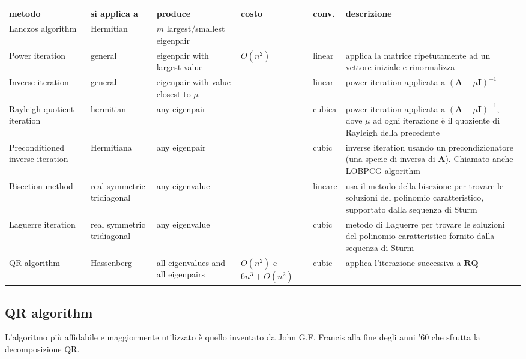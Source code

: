 \documentclass[10pt]{article}
\begin{document}
\noindent
\begin{tabular}{p{28mm} p{2cm} p{3cm} p{1cm} l l}
\textbf{metodo} & \textbf{si applica a} & \textbf{produce} & \textbf{costo} & \textbf{conv.} & \textbf{descrizione} \\
\hline
Lanczos algorithm & Hermitian & $m$ largest/smallest eigenpair & & & \\
\hline
Power iteration & general & eigenpair with largest value & $O(n^2)$ & linear & applica la matrice ripetutamente ad un vettore iniziale e rinormalizza \\
\hline
Inverse iteration & general & eigenpair with value closest to $\mu$ &  & linear & power iteration applicata a $(\mathbf{A} - \mu \mathbf{I})^{-1}$ \\
\hline
Rayleigh quotient iteration & hermitian & any eigenpair & & cubica & power iteration applicata a $(\mathbf{A} - \mu \mathbf{I})^{-1}$, dove $\mu$ ad ogni iterazione è il quoziente di Rayleigh della precedente \\
\hline
Preconditioned inverse iteration & Hermitiana & any eigenpair & & cubic & inverse iteration usando un precondizionatore (una specie di inversa di $\mathbf{A}$). Chiamato anche LOBPCG algorithm \\
\hline
Bisection method & real symmetric tridiagonal & any eigenvalue & & lineare & usa il metodo della bisezione per trovare le soluzioni del polinomio caratteristico, supportato dalla sequenza di Sturm \\
\hline
Laguerre iteration & real symmetric tridiagonal & any eigenvalue & & cubic & metodo di Laguerre per trovare le soluzioni del polinomio caratteristico fornito dalla sequenza di Sturm \\
\hline
QR algorithm & Hassenberg & all eigenvalues and all eigenpairs & $O(n^2)$ e $6n^3+O(n^2)$ & cubic & applica l'iterazione successiva a $\mathbf{R}\mathbf{Q}$ \\

\end{tabular}

\subsection{QR algorithm}

L'algoritmo più affidabile e maggiormente utilizzato è quello inventato da John G.F. Francis alla fine degli anni '60 che sfrutta la decomposizione QR.
\end{document}
